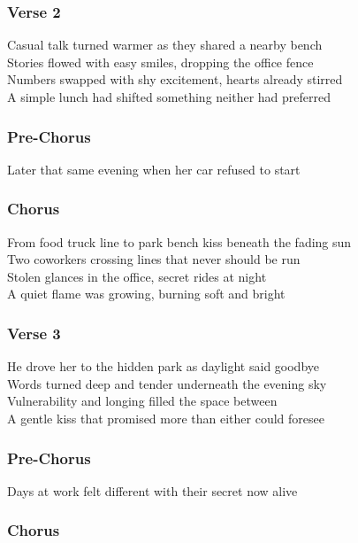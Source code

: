 \subsubsection{Verse 2}\label{verse-2-31}

Casual talk turned warmer as they shared a nearby bench\\
Stories flowed with easy smiles, dropping the office fence\\
Numbers swapped with shy excitement, hearts already stirred\\
A simple lunch had shifted something neither had preferred

\subsubsection{Pre-Chorus}\label{pre-chorus-58}

Later that same evening when her car refused to start

\subsubsection{Chorus}\label{chorus-79}

From food truck line to park bench kiss beneath the fading sun\\
Two coworkers crossing lines that never should be run\\
Stolen glances in the office, secret rides at night\\
A quiet flame was growing, burning soft and bright

\subsubsection{Verse 3}\label{verse-3-17}

He drove her to the hidden park as daylight said goodbye\\
Words turned deep and tender underneath the evening sky\\
Vulnerability and longing filled the space between\\
A gentle kiss that promised more than either could foresee

\subsubsection{Pre-Chorus}\label{pre-chorus-59}

Days at work felt different with their secret now alive

\subsubsection{Chorus}\label{chorus-80}

